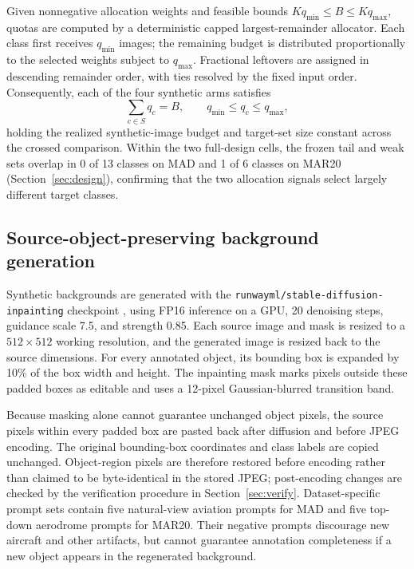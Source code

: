 \documentclass[preprint,12pt,authoryear]{elsarticle}
\begin{document}
Given nonnegative allocation weights and feasible bounds
$Kq_{\min}\leq B\leq Kq_{\max}$, quotas are computed by a deterministic
capped largest-remainder allocator. Each class first receives
$q_{\min}$ images; the remaining budget is distributed proportionally
to the selected weights subject to $q_{\max}$. Fractional leftovers are
assigned in descending remainder order, with ties resolved by the fixed
input order. Consequently, each of the four synthetic arms satisfies
\[
\sum_{c\in S}q_c=B,
\qquad
q_{\min}\leq q_c\leq q_{\max},
\]
holding the realized synthetic-image budget and target-set size
constant across the crossed comparison. Within the two full-design
cells, the frozen tail and weak sets overlap in 0 of 13 classes on MAD
and 1 of 6 classes on MAR20 (Section~\ref{sec:design}), confirming that
the two allocation signals select largely different target classes.

\subsection{Source-object-preserving background generation}\label{sec:generation}

Synthetic backgrounds are generated with the
\texttt{runwayml/stable-diffusion-inpainting} checkpoint
\citep{rombach2022ldm}, using FP16 inference on a GPU, 20 denoising
steps, guidance scale 7.5, and strength 0.85. Each source image and mask
is resized to a $512\times512$ working resolution, and the generated
image is resized back to the source dimensions. For every annotated
object, its bounding box is expanded by 10\% of the box width and height.
The inpainting mask marks pixels outside these padded boxes as editable
and uses a 12-pixel Gaussian-blurred transition band.

Because masking alone cannot guarantee unchanged object pixels, the
source pixels within every padded box are pasted back after diffusion
and before JPEG encoding. The original bounding-box coordinates and
class labels are copied unchanged. Object-region pixels are therefore
restored before encoding rather than claimed to be byte-identical in the
stored JPEG; post-encoding changes are checked by the verification
procedure in Section~\ref{sec:verify}. Dataset-specific prompt sets
contain five natural-view aviation prompts for MAD and five top-down
aerodrome prompts for MAR20. Their negative prompts discourage new
aircraft and other artifacts, but cannot guarantee annotation
completeness if a new object appears in the regenerated background.
\end{document}
